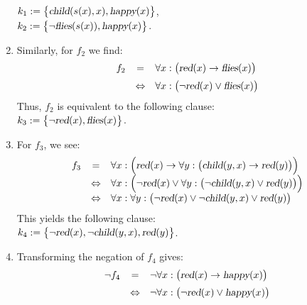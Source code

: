 \begin{enumerate}
      \\[0.2cm]
      \hspace*{1.3cm} $k_1 := \bigl\{ \textsl{child}(s(x),x), \textsl{happy}(x) \bigl\}$,   \\[0.2cm]
      \hspace*{1.3cm} $k_2 := \bigl\{ \neg \textsl{flies}(s(x)), \textsl{happy}(x) \bigl\}$. 
\item Similarly, for $f_2$ we find:
 $$
        \begin{array}{lcl}
            f_2 & =  & \forall x: \bigl(\textsl{red}(x) \rightarrow \textsl{flies}(x) \bigr) \\[0.2cm]
            & \Leftrightarrow  & \forall x: \bigl(\neg \textsl{red}(x) \vee \textsl{flies}(x) \bigr)
        \end{array}
      $$ 
      Thus, $f_2$ is equivalent to the following clause: \\[0.2cm]
      \hspace*{1.3cm} $k_3 := \bigl\{ \neg \textsl{red}(x), \textsl{flies}(x) \bigl\}$.
\item For $f_3$, we see:
 $$
        \begin{array}{lcl}
          f_3 & =          & \forall x: \Bigl(\textsl{red}(x) \rightarrow 
                             \forall y: \bigl(\textsl{child}(y,x) \rightarrow \textsl{red}(y)\bigr) \Bigr) \\
          &\Leftrightarrow & \forall x: \Bigl(\neg \textsl{red}(x) \vee 
                             \forall y: \bigl(\neg \textsl{child}(y,x) \vee \textsl{red}(y)\bigr)\Bigr) \\
          &\Leftrightarrow & \forall x: \forall y: \bigl(\neg \textsl{red}(x) \vee \neg \textsl{child}(y,x) \vee \textsl{red}(y)\bigr) \\
        \end{array}
      $$
     This yields the following clause: \\[0.2cm]
     \hspace*{1.3cm} $ k_4 := \bigl\{ \neg \textsl{red}(x), \neg \textsl{child}(y,x), \textsl{red}(y)\bigl\}$.
\item Transforming the negation of $f_4$ gives:
 $$
        \begin{array}{lcl}
         \neg f_4 & =      & \neg \forall x: \bigl(\textsl{red}(x) \rightarrow \textsl{happy}(x)\bigr) 
         \\[0.2cm]
                  & \Leftrightarrow & \neg \forall x: \bigl(\neg \textsl{red}(x) \vee \textsl{happy}(x) \bigr) \\

\end{array}$$
\end{enumerate}
